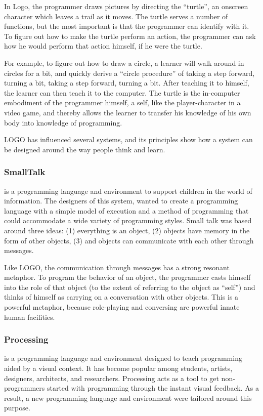 In Logo, the programmer draws pictures by directing the ``turtle'', an onscreen character which leaves a trail as it moves. The turtle serves a number of functions, but the most important is that the programmer can identify with it. To figure out how to make the turtle perform an action, the programmer can ask how he would perform that action himself, if he were the turtle.

For example, to figure out how to draw a circle, a learner will walk around in circles for a bit, and quickly derive a ``circle procedure'' of taking a step forward, turning a bit, taking a step forward, turning a bit. After teaching it to himself, the learner can then teach it to the computer. The turtle is the in-computer embodiment of the programmer himself, a self, like the player-character in a video game, and thereby allows the learner to 
transfer his knowledge of his own body into knowledge of programming.

LOGO has influenced several systems, and its principles show how a system can be designed around the way people think and learn.
\subsubsection{SmallTalk~\cite{Kay1993}} is a programming language and environment to support children in the world of information. The designers of this system, wanted to create a programming language with a simple model of execution and a method of programming that could accommodate a wide variety of programming styles. Small talk was based around three ideas: (1) everything is an object, (2) objects have memory in the form of other objects, (3) and objects can communicate with each other through messages.

Like LOGO, the communication through messages has a strong resonant metaphor. To program the behavior of an object, the programmer casts himself into the role of that object (to the extent of referring to the object as ``self'') and thinks of himself as carrying on a conversation with other objects. This is a powerful metaphor, because role-playing and conversing are powerful innate human facilities. 
\subsubsection{Processing~\cite{Reas2006}} is a programming language and environment designed to teach programming aided by a visual context. It has become popular among students, artists, designers, architects, and researchers. Processing acts as a tool to get non-programmers started with programming through the instant visual feedback. As a result, a new programming language and environment were tailored around this purpose.

